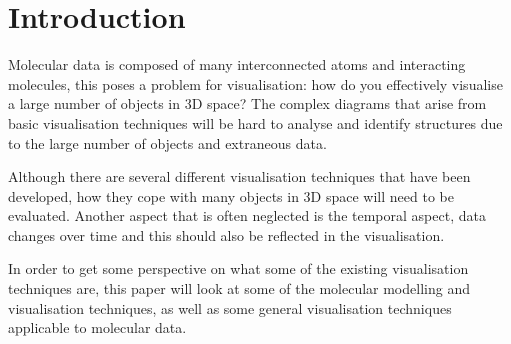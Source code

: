 \chapter{Introduction}
\label{chap:introduction}

Molecular data is composed of many interconnected atoms and interacting
molecules, this poses a problem for visualisation: how do you effectively
visualise a large number of objects in 3D space? The complex diagrams that arise
from basic visualisation techniques will be hard to analyse and identify
structures due to the large number of objects and extraneous data.

Although there are several different visualisation techniques that have been
developed, how they cope with many objects in 3D space will need to be
evaluated. Another aspect that is often neglected is the temporal aspect, data
changes over time and this should also be reflected in the visualisation.

In order to get some perspective on what some of the existing visualisation
techniques are, this paper will look at some of the molecular modelling and
visualisation techniques, as well as some general visualisation techniques
applicable to molecular data.
 

